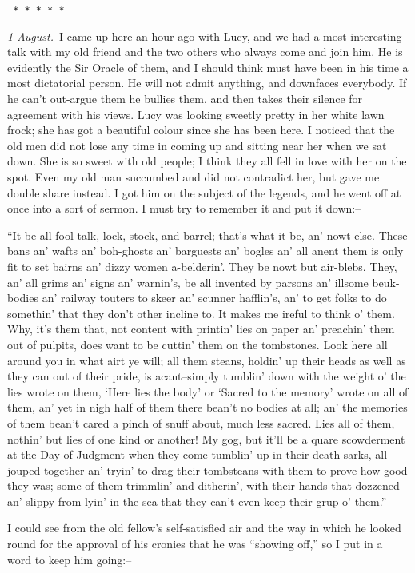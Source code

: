 \documentclass[12pt,openright]{book}
\begin{document}
\texttt{   *       *       *       *       *}

\textit{1 August.}–I came up here an hour ago with Lucy, and we had a most interesting talk with my old friend and the two others who always come and join him. He is evidently the Sir Oracle of them, and I should think must have been in his time a most dictatorial person. He will not admit anything, and downfaces everybody. If he can’t out-argue them he bullies them, and then takes their silence for agreement with his views. Lucy was looking sweetly pretty in her white lawn frock; she has got a beautiful colour since she has been here. I noticed that the old men did not lose any time in coming up and sitting near her when we sat down. She is so sweet with old people; I think they all fell in love with her on the spot. Even my old man succumbed and did not contradict her, but gave me double share instead. I got him on the subject of the legends, and he went off at once into a sort of sermon. I must try to remember it and put it down:–

“It be all fool-talk, lock, stock, and barrel; that’s what it be, an’ nowt else. These bans an’ wafts an’ boh-ghosts an’ barguests an’ bogles an’ all anent them is only fit to set bairns an’ dizzy women a-belderin’. They be nowt but air-blebs. They, an’ all grims an’ signs an’ warnin’s, be all invented by parsons an’ illsome beuk-bodies an’ railway touters to skeer an’ scunner hafflin’s, an’ to get folks to do somethin’ that they don’t other incline to. It makes me ireful to think o’ them. Why, it’s them that, not content with printin’ lies on paper an’ preachin’ them out of pulpits, does want to be cuttin’ them on the tombstones. Look here all around you in what airt ye will; all them steans, holdin’ up their heads as well as they can out of their pride, is acant–simply tumblin’ down with the weight o’ the lies wrote on them, ‘Here lies the body’ or ‘Sacred to the memory’ wrote on all of them, an’ yet in nigh half of them there bean’t no bodies at all; an’ the memories of them bean’t cared a pinch of snuff about, much less sacred. Lies all of them, nothin’ but lies of one kind or another! My gog, but it’ll be a quare scowderment at the Day of Judgment when they come tumblin’ up in their death-sarks, all jouped together an’ tryin’ to drag their tombsteans with them to prove how good they was; some of them trimmlin’ and ditherin’, with their hands that dozzened an’ slippy from lyin’ in the sea that they can’t even keep their grup o’ them.”

I could see from the old fellow’s self-satisfied air and the way in which he looked round for the approval of his cronies that he was “showing off,” so I put in a word to keep him going:–
\end{document}

